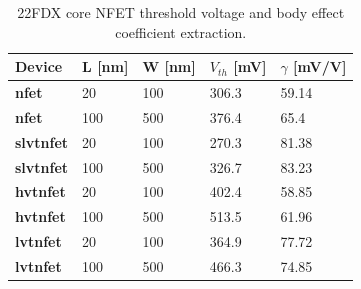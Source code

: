 			\begin{table}[htb!]
				\centering
				\def\arraystretch{1.5}		
				\setlength\arrayrulewidth{1pt}
				\setlength{\tabcolsep}{1em} %
				\fontfamily{\sfdefault}\selectfont 
				\begin{tabular}{|l|l|l|l|l|}	
					\hline 
					\rule[-1ex]{0pt}{2.5ex} \cellcolor{gray!40}\textbf{Device} & \cellcolor{gray!40}\textbf{L [nm]} & \cellcolor{gray!40}\textbf{W [nm]} & \cellcolor{gray!40}\textbf{$V_{th}$ [mV]} & \cellcolor{gray!40}\textbf{$\gamma$ [mV/V]}\\ 
					\hline 
					\rule[-1ex]{0pt}{2.5ex} \textbf{nfet} & 20 & 100 & 306.3 & 59.14 \\ 
					\hline 
					\rule[-1ex]{0pt}{2.5ex} \textbf{nfet} & 100 & 500 & 376.4 & 65.4 \\ 
					\hline 
					\rule[-1ex]{0pt}{2.5ex} \textbf{slvtnfet} & 20 & 100 & 270.3 & 81.38 \\ 
					\hline 
					\rule[-1ex]{0pt}{2.5ex} \textbf{slvtnfet} & 100 & 500 & 326.7 & 83.23 \\ 
					\hline 
					\rule[-1ex]{0pt}{2.5ex} \textbf{hvtnfet} & 20 & 100 & 402.4 & 58.85 \\ 
					\hline 
					\rule[-1ex]{0pt}{2.5ex} \textbf{hvtnfet} & 100 & 500 & 513.5 & 61.96 \\ 
					\hline 
					\rule[-1ex]{0pt}{2.5ex} \textbf{lvtnfet} & 20 & 100 & 364.9 & 77.72 \\ 
					\hline 
					\rule[-1ex]{0pt}{2.5ex} \textbf{lvtnfet} & 100 & 500 & 466.3 & 74.85 \\ 
					\hline 
				\end{tabular} 
				\caption{22FDX core NFET threshold voltage and body effect coefficient extraction.}
				\label{tab:nfet_vth_gamma}
			\end{table} 

